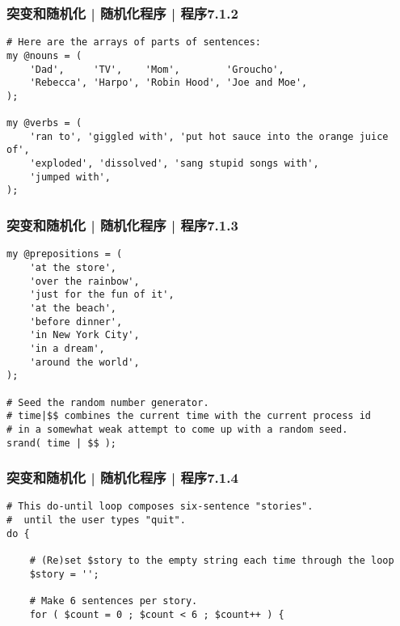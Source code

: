 \begin{frame}[fragile]
  \frametitle{突变和随机化 | 随机化程序 | 程序7.1.2}
  \vspace{-1.5em}
\begin{lstlisting}[firstnumber=15,basicstyle=\small\tt]
# Here are the arrays of parts of sentences:
my @nouns = (
    'Dad',     'TV',    'Mom',        'Groucho',
    'Rebecca', 'Harpo', 'Robin Hood', 'Joe and Moe',
);

my @verbs = (
    'ran to', 'giggled with', 'put hot sauce into the orange juice of',
    'exploded', 'dissolved', 'sang stupid songs with',
    'jumped with',
);
\end{lstlisting}
\end{frame}

\begin{frame}[fragile]
  \frametitle{突变和随机化 | 随机化程序 | 程序7.1.3}
  \vspace{-1.5em}
\begin{lstlisting}[firstnumber=27,basicstyle=\small\tt]
my @prepositions = (
    'at the store',
    'over the rainbow',
    'just for the fun of it',
    'at the beach',
    'before dinner',
    'in New York City',
    'in a dream',
    'around the world',
);

# Seed the random number generator.
# time|$$ combines the current time with the current process id
# in a somewhat weak attempt to come up with a random seed.
srand( time | $$ );
\end{lstlisting}
\end{frame}

\begin{frame}[fragile]
  \frametitle{突变和随机化 | 随机化程序 | 程序7.1.4}
  \vspace{-1.5em}
\begin{lstlisting}[firstnumber=43]
# This do-until loop composes six-sentence "stories".
#  until the user types "quit".
do {

    # (Re)set $story to the empty string each time through the loop
    $story = '';

    # Make 6 sentences per story.
    for ( $count = 0 ; $count < 6 ; $count++ ) {
\end{lstlisting}
\end{frame}

